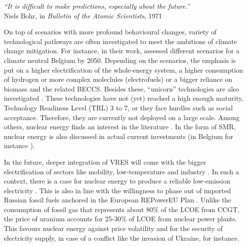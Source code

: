 \vspace{-0.2cm}
\begin{flushright}
\emph{``It is difficult to make predictions, especially about the future.''}\\
Niels Bohr, in \textit{Bulletin of the Atomic Scientists}, 1971
\end{flushright}
\vspace{0.4cm}

On top of scenarios with more profound behavioural changes, variety of technological pathways are often investigated to meet the ambitions of climate change mitigation. For instance, in their work, \citet{My2050} assessed different scenarios for a climate neutral Belgium by 2050. Depending on the scenarios, the emphasis is put on a higher electrification of the whole-energy system, a higher consumption of hydrogen or more complex moleclules (\ie electrofuels) or a bigger reliance on biomass and the related \gls{BECCS}. Besides these, ``unicorn'' technologies are also investigated \cite{heuberger2018impact}. These technologies have not (yet) reached a high enough maturity, \ie Technology Readiness Level (TRL) 3 to 7, or they face hurdles such as social acceptance. Therefore, they are currently not deployed on a large scale. Among others, nuclear energy finds an interest in the literature \cite{IEA_Nuclear_2022,PATHS2050}. In the form of \acrfull{SMR}, nuclear energy is also discussed in actual current investments (in Belgium for instance \cite{SMRlesoir}).

In the future, deeper integration of \gls{VRES} will come with the bigger electrification of sectors like mobility, low-temperature and industry \cite{IEA2023electrification}. In such a context, there is a case for nuclear energy to produce a reliable low-emission electricity \cite{IAEA2008}. This is also in line with the willingness to phase out of imported Russian fossil fuels anchored in the European REPowerEU Plan \cite{REPowerEU}. Unlike the consumption of fossil gas that represents about 80\% of the \gls{LCOE} from \gls{CCGT}, the price of uranium accounts for 25-30\% of \gls{LCOE} from nuclear power plants. This favours nuclear energy against price volatility and for the security of electricity supply, in case of a conflict like the invasion of Ukraine, for instance.

